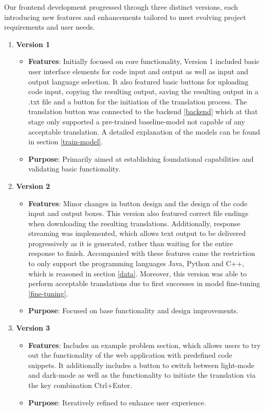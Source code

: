 \documentclass[conference]{IEEEtran}
\begin{document}
Our frontend development progressed through three distinct versions, each introducing new features and enhancements tailored to meet evolving project requirements and user needs.

\begin{enumerate}
    \item \textbf{Version 1}
    \begin{itemize}
        \item \textbf{Features}: Initially focused on core functionality, Version 1 included basic user interface elements for code input and output as well as input and output language selection. It also featured basic buttons for uploading code input, copying the resulting output, saving the resulting output in a .txt file and a button for the initiation of the translation process. The translation button was connected to the backend \ref{backend} which at that stage only supported a pre-trained baseline-model not capable of any acceptable translation. A detailed explanation of the models can be found in section \ref{train-model}.
        \item \textbf{Purpose}: Primarily aimed at establishing foundational capabilities and validating basic functionality.
    \end{itemize}
    
    \item \textbf{Version 2}
    \begin{itemize}
        \item \textbf{Features}: Minor changes in button design and the design of the code input and output boxes. This version also featured correct file endings when downloading the resulting translations. Additionally, response streaming was implemented, which allows text output to be delivered progressively as it is generated, rather than waiting for the entire response to finish. Accompanied with these features came the restriction to only support the programming languages Java, Python and C++, which is reasoned in section \ref{data}. Moreover, this version was able to perform acceptable translations due to first successes in model fine-tuning \ref{fine-tuning}. 
        \item \textbf{Purpose}: Focused on base functionality and design improvements.
    \end{itemize}
    
    \item \textbf{Version 3}
    \begin{itemize}
        \item \textbf{Features}: Includes an example problem section, which allows users to try out the functionality of the web application with predefined code snippets. It additionally includes a button to switch between light-mode and dark-mode as well as the functionality to initiate the translation via the key combination Ctrl+Enter.
        \item \textbf{Purpose}: Iteratively refined to enhance user experience.
    \end{itemize}
\end{enumerate}
\end{document}
